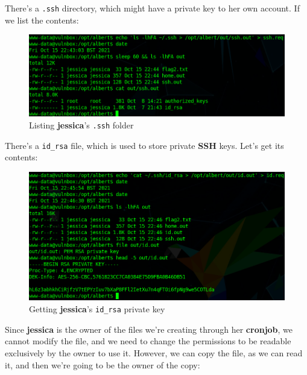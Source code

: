 \documentclass[12pt]{article}
\begin{document}
    There's a \texttt{.ssh} directory, which might have a private key to her own
    account. If we list the contents:

    \begin{figure}[H]\label{pic:54-cronjob-ls-ssh}
        \centering
        \includegraphics[width=1.00\textwidth]{54-cronjob-ls-ssh.png}
        \caption{Listing \textbf{jessica}'s \texttt{.ssh} folder}
    \end{figure}

    There's a \texttt{id\_rsa} file, which is used to store private \textbf{SSH}
    keys. Let's get its contents:

    \begin{figure}[H]\label{pic:55-cronjob-cat-id_rsa}
        \centering
        \includegraphics[width=1.00\textwidth]{55-cronjob-cat-id_rsa.png}
        \caption{Getting \textbf{jessica}'s \texttt{id\_rsa} private key}
    \end{figure}

    Since \textbf{jessica} is the owner of the files we're creating through her
    \textbf{cronjob}, we cannot modify the file, and we need to change the
    permissions to be readable exclusively by the owner to use it. However, we
    can copy the file, as we can read it, and then we're going to be the owner
    of the copy:
\end{document}
